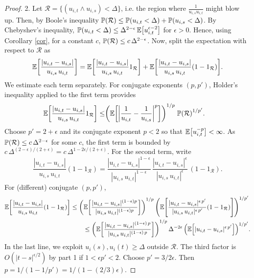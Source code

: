 \documentclass[11pt, twoside]{report}
\begin{document}
\begin{proof}
2. Let $\mathcal R=\{ (u_{i,t}\wedge u_{i,s})<\Delta\}$, i.e. the region where $\frac{1}{u_{i,s}u_{i,t}}$ might blow up. Then, by Boole's inequality $\prob(\mathcal R) \le  \prob\pp{u_{i,t}<\Delta} +  \prob\pp{u_{i,s}<\Delta}$.  By Chebyshev's inequality, $\prob\pp{u_{i,t}<\Delta}\le  \Delta^{2-\epsilon}\, \mean{u_{i,t}^{\epsilon-2}}$ for $\epsilon>0$. Hence, using Corollary \ref{cor}, for a constant $c$, $\prob\pp{\mathcal R}\le c \,\Delta^{2-\epsilon}$. Now, split the expectation with respect to $\mathcal R$ as 
 \begin{equation}
     \mathbb{E} \bp{\frac {|u_{i,t}-u_{i,s}|}{u_{i,s}\,u_{i,t}}} 
     =   \mathbb{E} \bp{\frac {|u_{i,t}-u_{i,s}|}{u_{i,s}\,u_{i,t}}1_{\mathcal R}}
     +    \mathbb{E} \bp{\frac {|u_{i,t}-u_{i,s}|}{u_{i,s}\,u_{i,t}} (1-1_{\mathcal R})}.
 \end{equation}
 We estimate each term separately. For conjugate exponents $(p,p')$, Holder's inequality applied to the first term provides
 \begin{align*}
     \mathbb{E} \bp{\frac {|u_{i,t}-u_{i,s}|}{u_{i,s}\,u_{i,t}}1_{\mathcal R}}
  \le&     \pp{\mathbb{E} \bp{\abs{\frac 1 {u_{i,t}}-\frac1{u_{i,s}} }^p}
  }^{1/p}\;\prob\pp{\mathcal R}^{ 1/{p'}}. 
 \end{align*}
 Choose $p'=2+\epsilon$ and its conjugate exponent $p<2$ so that  $\mean{u_{i,t}^{-p}}<\infty$. As $\mathbb{P}(\mathcal{R})\le c\, \Delta^{2-\epsilon}$ for some $c$, 
  the first term is bounded by $c\,\Delta^{
  (2-\epsilon)/(2+\epsilon)}= c\,\Delta^{1-2\epsilon/(2+\epsilon)}$. For the second term, write
  \[
     \frac {|u_{i,t}-u_{i,s}|}{u_{i,s}\,u_{i,t}} (1-1_{\mathcal R})
   =    \frac {|u_{i,t}-u_{i,s}|^{1-\epsilon}}{|u_{i,s}\,u_{i,t}|^{1-\epsilon}}\,\frac {|u_{i,t}-u_{i,s}|^{\epsilon}}{|u_{i,s}\,u_{i,t}|^{\epsilon}}\,
   (1-1_{\mathcal R}).
   \]
For (different) conjugate $(p,p')$,
 \begin{align*}
  \mathbb{E} \bp{\frac {|u_{i,t}-u_{i,s}|}{u_{i,s}\,u_{i,t}} (1-1_{\mathcal R})} & \le \pp{  \mathbb{E} \bp{\frac {|u_{i,t}-u_{i,s}|^{(1-\epsilon)p}}{|u_{i,s}\,u_{i,t}|^{(1-\epsilon)p}}}}^{1/p}\,\pp{ \mathbb{E} \bp{\frac {|u_{i,t}-u_{i,s}|^{\epsilon\,p'}}{|u_{i,s}\,u_{i,t}|^{\epsilon\,p'}}(1-1_{\mathcal R})}}^{1/p'}\\
&\qquad     \le  \pp{\mathbb{E} \bp{\frac {|u_{i,t}-u_{i,s}|^{(1-\epsilon)\,p}}{|u_{i,s}\,u_{i,t}|^{(1-\epsilon)\,p}}}}^{1/p}\, \Delta^{-2\epsilon
     }\,\pp{\mathbb{E} \bp{ {|u_{i,t}-u_{i,s}|^{\epsilon\, p'}}}}^{1/p'}.
   \end{align*}
In the last line, we exploit  $u_i(s),u_i(t) \geq \Delta$ outside $\mathcal R$.
The third factor is $O(|t-s|^{\epsilon/2})$ by part 1 if $1<\epsilon p'<2$. Choose $p'=3/2\epsilon$. Then $p=1/(1-1/p')=1/(1-(2/3)\epsilon)$.


\end{proof}
\end{document}
